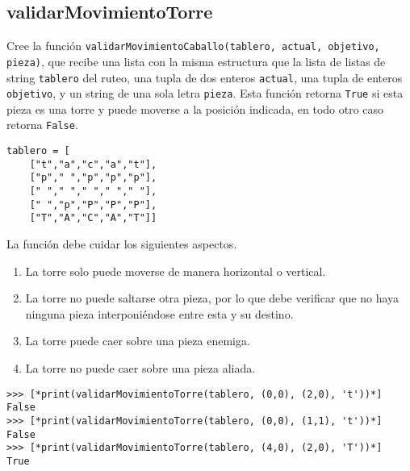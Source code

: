 \subsection*{validarMovimientoTorre}

Cree la función \texttt{validarMovimientoCaballo(tablero, actual, objetivo, pieza)}, que recibe una lista con la misma estructura que la lista de listas de string \texttt{tablero} del ruteo, una tupla de dos enteros \texttt{actual}, una tupla de enteros \texttt{objetivo}, y un string de una sola letra \texttt{pieza}. Esta función retorna \texttt{True} si esta pieza es una torre y puede moverse a la posición indicada, en todo otro caso retorna \texttt{False}.

\begin{lstlisting}[style=consola]
tablero = [
    ["t","a","c","a","t"],
    ["p"," ","p","p","p"],
    [" "," "," "," "," "],
    [" ","p","P","P","P"],
    ["T","A","C","A","T"]]
\end{lstlisting}

La función debe cuidar los siguientes aspectos.
\begin{enumerate}
    \item La torre solo puede moverse de manera horizontal o vertical.
    \item La torre no puede saltarse otra pieza, por lo que debe verificar que no haya ninguna pieza interponiéndose entre esta y su destino.
    \item La torre puede caer sobre una pieza enemiga.
    \item La torre no puede caer sobre una pieza aliada.
\end{enumerate}


\begin{lstlisting}[style=consola]
>>> [*print(validarMovimientoTorre(tablero, (0,0), (2,0), 't'))*]
False
>>> [*print(validarMovimientoTorre(tablero, (0,0), (1,1), 't'))*]
False
>>> [*print(validarMovimientoTorre(tablero, (4,0), (2,0), 'T'))*]
True
\end{lstlisting}
